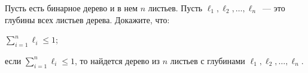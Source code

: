 Пусть есть бинарное дерево и в нем $n$ листьев. Пусть $\ell_1, \ell_2, \dots, \ell_n$~--- это глубины всех листьев
дерева. Докажите, что:
\begin{enumcyr}
    \item $\sum\limits_{i = 1}^n \ell_i \le 1$;
    \item если $\sum\limits_{i = 1}^n \ell_i \le 1$, то найдется дерево из $n$ листьев с глубинами $\ell_1, \ell_2, \dots,
	    \ell_n$.
\end{enumcyr}